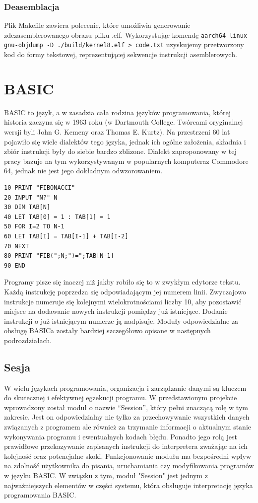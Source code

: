 \documentclass[shortabstract]{iithesis}
\begin{document}
\subsection{Deasemblacja}
Plik Makefile zawiera polecenie, które umożliwia generowanie zdezasemblerowanego obrazu pliku .elf. Wykorzystując komendę \texttt{aarch64-linux-gnu-objdump -D ./build/kernel8.elf > code.txt} uzyskujemy przetworzony kod do formy tekstowej, reprezentującej sekwencje instrukcji asemblerowych.


\chapter{BASIC}
BASIC to język, a w zasadzia cała rodzina języków programowania, której historia zaczyna się w 1963 roku (w Dartmouth College. Twórcami oryginalnej wersji byli John G. Kemeny oraz Thomas E. Kurtz). Na przestrzeni 60 lat pojawiło się wiele dialektów tego języka, jednak ich ogólne założenia, składnia i zbiór instrukcji były do siebie bardzo zblizone. Dialekt zaproponowany w tej pracy bazuje na tym wykorzystywanym w popularnych komputeraz Commodore 64, jednak nie jest jego dokładnym odwzorowaniem.

\begin{verbatim}
10 PRINT "FIBONACCI"
20 INPUT "N?" N
30 DIM TAB[N]
40 LET TAB[0] = 1 : TAB[1] = 1
50 FOR I=2 TO N-1
60 LET TAB[I] = TAB[I-1] + TAB[I-2]
70 NEXT
80 PRINT "FIB(";N;")=";TAB[N-1]
90 END
\end{verbatim}

Programy pisze się inaczej niż jakby robiło się to w zwykłym edytorze tekstu. Każdą instrukcję poprzedza się odpowiadającym jej numerem linii. Zwyczajowo instrukcje numeruje się kolejnymi wielokrotnościami liczby 10, aby pozostawić miejsce na dodawanie nowych instrukcji pomiędzy już istniejące. Dodanie instrukcji o już istniejącym numerze ją nadpisuje. Moduły odpowiedzialne za obsługę BASICa zostały bardziej szczegółowo opisane w następnych podrozdziałach.

\section{Sesja}
W wielu językach programowania, organizacja i zarządzanie danymi są kluczem do skutecznej i efektywnej egzekucji programu. W przedstawionym projekcie wprowadzony został moduł o nazwie “Session”, który pełni znaczącą rolę w tym zakresie. Jest on odpowiedzialny nie tylko za przechowywanie wszystkich danych związanych z programem ale również za trzymanie informacji o aktualnym stanie wykonywania programu i ewentualnych kodach błędu. Ponadto jego rolą jest prawidłowe przekazywanie zapisanych instrukcji do interpretera zważając na ich kolejność oraz potencjalne skoki. Funkcjonowanie modułu ma bezpośredni wpływ na zdolność użytkownika do pisania, uruchamiania czy modyfikowania programów w języku BASIC. W związku z tym, moduł "Session" jest jednym z najważniejszych elementów w części systemu, która obsługuje interpretację języka programowania BASIC.
\end{document}
